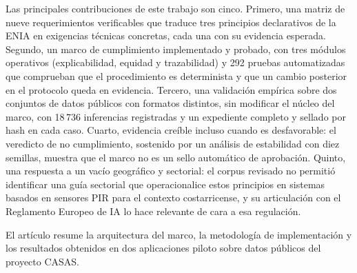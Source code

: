 Las principales contribuciones de este trabajo son cinco. Primero, una matriz de
nueve requerimientos verificables que traduce tres principios declarativos de la
ENIA en exigencias técnicas concretas, cada una con su evidencia esperada.
Segundo, un marco de cumplimiento implementado y probado, con tres módulos
operativos (explicabilidad, equidad y trazabilidad) y 292 pruebas automatizadas
que comprueban que el procedimiento es determinista y que un cambio posterior en
el protocolo queda en evidencia. Tercero, una validación empírica sobre dos
conjuntos de datos públicos con formatos distintos, sin modificar el núcleo del
marco, con 18\,736 inferencias registradas y un expediente completo y sellado por
hash en cada caso. Cuarto, evidencia creíble incluso cuando es desfavorable: el
veredicto de no cumplimiento, sostenido por un análisis de estabilidad con diez
semillas, muestra que el marco no es un sello automático de aprobación. Quinto,
una respuesta a un vacío geográfico y sectorial: el corpus revisado no permitió
identificar una guía sectorial que operacionalice estos principios en sistemas
basados en sensores PIR para el contexto costarricense, y su articulación con el
Reglamento Europeo de IA lo hace relevante de cara a esa regulación.

El artículo resume la arquitectura del marco, la metodología de implementación y
los resultados obtenidos en dos aplicaciones piloto sobre datos públicos del
proyecto CASAS.
